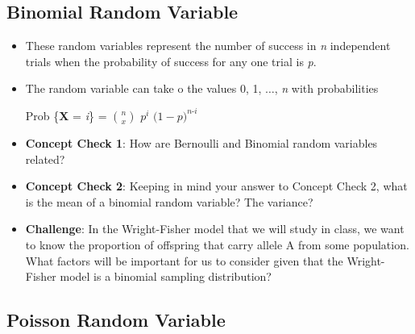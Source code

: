 \documentclass[12pt]{report}
\begin{document}
\bigskip

\bigskip

\bigskip

\bigskip

\bigskip

\bigskip

\bigskip

\subsection{Binomial Random Variable}

\begin{itemize}

\item These random variables represent the number of success in \textit{n} independent trials when the probability of success for any one trial is \textit{p}. 

\item The random variable can take o the values 0, 1, $\ldots$, \textit{n} with probabilities

Prob \{\textbf{X} = \textit{i}\} = ${n \choose x}$ \textit{$p^{i}$} $\big( 1- \textit{p} \big)^{\textit{n-i}}$

\item \textbf{Concept Check 1}: How are Bernoulli and Binomial random variables related?

\bigskip

\bigskip

\bigskip

\item \textbf{Concept Check 2}: Keeping in mind your answer to Concept Check 2, what is the mean of a binomial random variable? The variance?

\bigskip

\bigskip

\bigskip

\item \textbf{Challenge}: In the Wright-Fisher model that we will study in class, we want to know the proportion of offspring that carry allele A from some population. What factors will be important for us to consider given that the Wright-Fisher model is a binomial sampling distribution?

\bigskip

\bigskip

\bigskip

\end{itemize}

\subsection{Poisson Random Variable}
\end{document}

